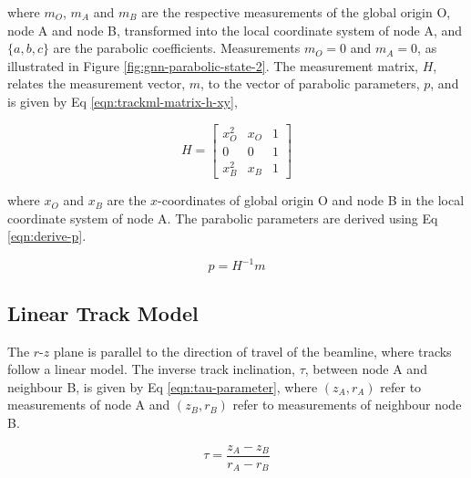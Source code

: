 where $m_O$, $m_A$ and $m_B$ are the respective measurements of the global origin O, node A and node B, transformed into the local coordinate system of node A, and $\{a, b, c\}$ are the parabolic coefficients. Measurements $m_O = 0$ and $m_A = 0$, as illustrated in Figure \ref{fig:gnn-parabolic-state-2}. The measurement matrix, $H$, relates the measurement vector, $m$, to the vector of parabolic parameters, $p$, and is given by Eq \eqref{eqn:trackml-matrix-h-xy},

\begin{equation}
    H = \begin{bmatrix} x_O^{2} & x_O & 1 \\ 0 & 0 & 1 \\ x_B^{2} & x_B & 1 \end{bmatrix} 
    \label{eqn:trackml-matrix-h-xy}
\end{equation}

where $x_O$ and $x_B$ are the $x$-coordinates of global origin O and node B in the local coordinate system of node A. The parabolic parameters are derived using Eq \eqref{eqn:derive-p}.

\begin{equation}
    p = H^{-1} m 
    \label{eqn:derive-p}
\end{equation}




\subsection{Linear Track Model}
\label{linear-state}

The $r$-$z$ plane is parallel to the direction of travel of the beamline, where tracks follow a linear model. The inverse track inclination, $\tau$, between node A and neighbour B, is given by Eq \eqref{eqn:tau-parameter}, where $(z_A, r_A)$ refer to measurements of node A and $(z_B, r_B)$ refer to measurements of neighbour node B.

\begin{equation}
\tau = \frac{z_A - z_B}{r_A - r_B}
\label{eqn:tau-parameter}
\end{equation}

